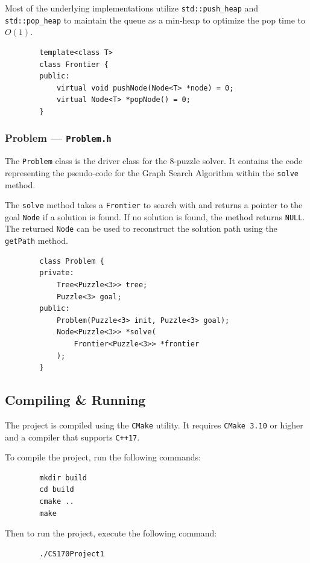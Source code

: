 \documentclass[12pt, english]{article}
\begin{document}
    Most of the underlying implementations utilize \lstinline|std::push_heap| and \lstinline|std::pop_heap|
    to maintain the queue as a min-heap to optimize the pop time to $O(1)$.

    \begin{lstlisting}
        template<class T>
        class Frontier {
        public:
            virtual void pushNode(Node<T> *node) = 0;
            virtual Node<T> *popNode() = 0;
        }
    \end{lstlisting}

    \subsubsection{Problem --- \texttt{Problem.h}}
    The \lstinline|Problem| class is the driver class for the 8-puzzle solver.
    It contains the code representing the pseudo-code for the Graph Search Algorithm
    within the \lstinline|solve| method.

    The \lstinline|solve| method takes a \lstinline|Frontier| to search with and returns
    a pointer to the goal \lstinline|Node| if a solution is found. If no solution is found,
    the method returns \lstinline|NULL|. The returned \lstinline|Node| can be used to
    reconstruct the solution path using the \lstinline|getPath| method.

    \begin{lstlisting}
        class Problem {
        private:
            Tree<Puzzle<3>> tree;
            Puzzle<3> goal;
        public:
            Problem(Puzzle<3> init, Puzzle<3> goal);
            Node<Puzzle<3>> *solve(
                Frontier<Puzzle<3>> *frontier
            );
        }
    \end{lstlisting}

    \subsection{Compiling \& Running}

    The project is compiled using the \texttt{CMake} utility.
    It requires \texttt{CMake 3.10} or higher and a compiler that supports \texttt{C++17}.

    To compile the project, run the following commands:
    \begin{lstlisting}
        mkdir build
        cd build
        cmake ..
        make
    \end{lstlisting}

    Then to run the project, execute the following command:
    \begin{lstlisting}
        ./CS170Project1
    \end{lstlisting}
\end{document}
